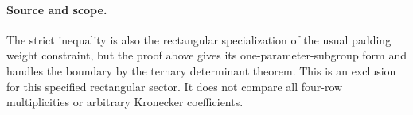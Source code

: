 \paragraph{Source and scope.}
The strict inequality is also the rectangular specialization
of the usual padding weight constraint, but the proof above
gives its one-parameter-subgroup form and handles the
boundary by the ternary determinant theorem. This is an
exclusion for this specified rectangular sector. It does
not compare all four-row multiplicities or arbitrary
Kronecker coefficients.
